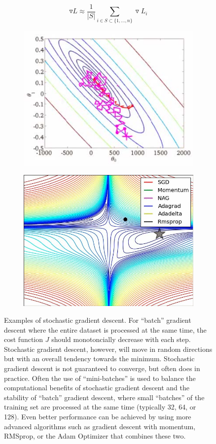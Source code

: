 \documentclass[twoside]{article}
\begin{document}
$$\triangledown L \approx \frac{1}{|S|}\sum_{i\in S \subset \{1,...,n\}} \triangledown L_i$$

\begin{figure}[H]
    \centering
    \begin{subfigure}{.5\textwidth}
      \centering
      \includegraphics[width=.5\linewidth]{pics/lecture_8_stochastic_grad_desc.jpg}
    \end{subfigure}%
    \begin{subfigure}{.5\textwidth}
      \centering
      \includegraphics[width=.5\linewidth]{pics/lecture_8_grad_desc_options.jpg}
    \end{subfigure}
    \caption{Examples of stochastic gradient descent. For ``batch'' gradient descent where the entire dataset is processed at the same time, the cost function $J$ should monotoncially decrease with each step. Stochastic gradient descent, however, will move in random directions but with an overall tendency towards the minimum. Stochastic gradient descent is not guaranteed to converge, but often does in practice. Often the use of ``mini-batches'' is used to balance the computational benefits of stochastic gradient descent and the stability of ``batch'' gradient descent, where small ``batches'' of the training set are processed at the same time (typically 32, 64, or 128). Even better performance can be achieved by using more advanced algorithms such as gradient descent with momentum, RMSprop, or the Adam Optimizer that combines these two. }
\end{figure}
\end{document}
